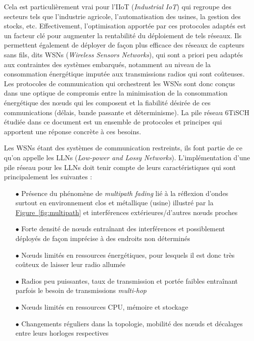 \documentclass[]{report}
\newcommand{\wordlink}[2]{\hyperref[#2]{#1~\ref{#2}}}
\begin{document}
\par Cela est particulièrement vrai pour l'IIoT (\textit{Industrial IoT}) qui regroupe des secteurs tels que l'industrie agricole, l'automatisation des usines, la gestion des stocks, etc. Effectivement, l'optimisation apportée par ces protocoles adaptés est un facteur clé pour augmenter la rentabilité du déploiement de tels réseaux. Ils permettent également de déployer de façon plus efficace des réseaux de capteurs sans fils, dits WSNs (\textit{Wireless Sensors Networks}), qui sont a priori peu adaptés aux contraintes des systèmes embarqués, notamment au niveau de la consommation énergétique imputée aux transmissions radios qui sont coûteuses. Les protocoles de communication qui orchestrent les WSNs sont donc conçus dans une optique de compromis entre la minimisation de la consommation énergétique des nœuds qui les composent et la fiabilité désirée de ces communications (délais, bande passante et déterminisme). La pile réseau 6TiSCH étudiée dans ce document est un ensemble de protocoles et principes qui apportent une réponse concrète à ces besoins.\\

\par Les WSNs étant des systèmes de communication restreints, ils font partie de ce qu'on appelle les LLNs (\textit{Low-power and Lossy Networks}). L'implémentation d'une pile réseau pour les LLNs doit tenir compte de leurs caractéristiques qui sont principalement les suivantes :\\

\begin{itemize}
\item[$\bullet$] Présence du phénomène de \textit{multipath fading} lié à la réflexion d'ondes surtout en environnement clos et métallique (usine) illustré par la \wordlink{Figure}{fig:multipath} et interférences extérieures/d'autres nœuds proches
\vspace{0.2cm}
\item[$\bullet$] Forte densité de nœuds entraînant des interférences et possiblement déployés de façon imprécise à des endroits non déterminés
\vspace{0.2cm}
\item[$\bullet$] Nœuds limités en ressources énergétiques, pour lesquels il est donc très coûteux de laisser leur radio allumée
\vspace{0.2cm}
\item[$\bullet$] Radios peu puissantes, taux de transmission et portée faibles entraînant parfois le besoin de transmissions \textit{multi-hop}
\vspace{0.2cm}
\item[$\bullet$] Nœuds limités en ressources CPU, mémoire et stockage
\vspace{0.2cm}
\item[$\bullet$] Changements réguliers dans la topologie, mobilité des nœuds et décalages entre leurs horloges respectives
\end{itemize}
~\\
\end{document}
